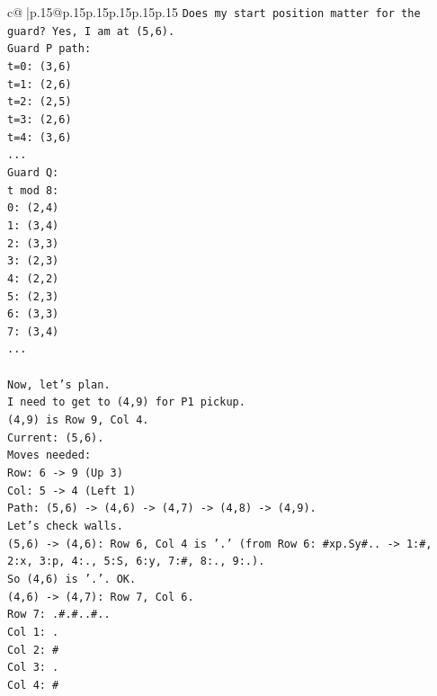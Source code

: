 \documentclass{article}
\begin{document}
{\begin{supertabular}{c@{$\;$}|p{.15\linewidth}@{}p{.15\linewidth}p{.15\linewidth}p{.15\linewidth}p{.15\linewidth}p{.15\linewidth}}
{{{\texttt{Does my start position matter for the guard? Yes, I am at (5,6).} \\
\texttt{Guard P path:} \\
\texttt{t=0: (3,6)} \\
\texttt{t=1: (2,6)} \\
\texttt{t=2: (2,5)} \\
\texttt{t=3: (2,6)} \\
\texttt{t=4: (3,6)} \\
\texttt{...} \\
\texttt{Guard Q:} \\
\texttt{t mod 8:} \\
\texttt{0: (2,4)} \\
\texttt{1: (3,4)} \\
\texttt{2: (3,3)} \\
\texttt{3: (2,3)} \\
\texttt{4: (2,2)} \\
\texttt{5: (2,3)} \\
\texttt{6: (3,3)} \\
\texttt{7: (3,4)} \\
\texttt{...} \\
\\ 
\texttt{Now, let's plan.} \\
\texttt{I need to get to (4,9) for P1 pickup.} \\
\texttt{(4,9) is Row 9, Col 4.} \\
\texttt{Current: (5,6).} \\
\texttt{Moves needed:} \\
\texttt{Row: 6 {-}> 9 (Up 3)} \\
\texttt{Col: 5 {-}> 4 (Left 1)} \\
\texttt{Path: (5,6) {-}> (4,6) {-}> (4,7) {-}> (4,8) {-}> (4,9).} \\
\texttt{Let's check walls.} \\
\texttt{(5,6) {-}> (4,6): Row 6, Col 4 is '.' (from Row 6: \#xp.Sy\#.. {-}> 1:\#, 2:x, 3:p, 4:., 5:S, 6:y, 7:\#, 8:., 9:.).} \\
\texttt{So (4,6) is '.'. OK.} \\
\texttt{(4,6) {-}> (4,7): Row 7, Col 6.} \\
\texttt{Row 7: .\#.\#..\#..} \\
\texttt{Col 1: .} \\
\texttt{Col 2: \#} \\
\texttt{Col 3: .} \\
\texttt{Col 4: \#} \\
}}}
\end{supertabular}}
\end{document}

